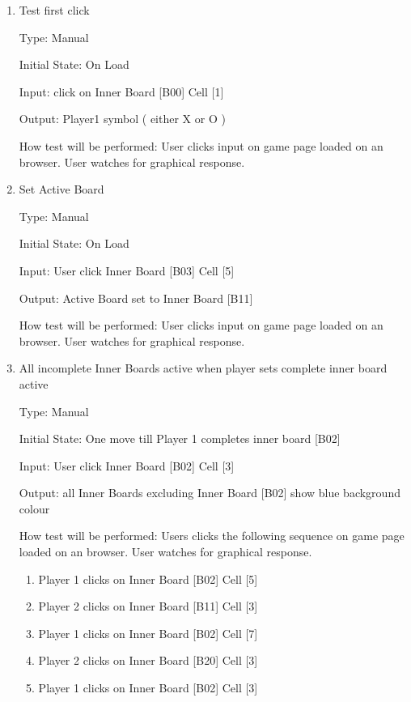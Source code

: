 \documentclass[12pt, titlepage]{article}
\begin{document}
\begin{enumerate}

\item{Test first click\\}

Type: Manual
					
Initial State: On Load
					
Input: click on Inner Board [B00] Cell [1] 
					
Output: Player1 symbol ( either X or O )
					
How test will be performed: User clicks input on game page loaded on an browser. User watches for graphical response.

\item{Set Active Board\\}

Type: Manual
					
Initial State: On Load
					
Input: User click Inner Board [B03] Cell [5] 
					
Output:  Active Board set to Inner Board [B11]
					
How test will be performed: User clicks input on game page loaded on an browser. User watches for graphical response. 

\item{All incomplete Inner Boards active when player sets complete inner board active \\}

Type: Manual
					
Initial State: One move till Player 1 completes inner board [B02]
					
Input: User click Inner Board [B02] Cell [3] 
					
Output:  all Inner Boards excluding Inner Board [B02] show blue background colour
					
How test will be performed: Users clicks the following sequence on game page loaded on an browser. User watches for graphical response.
\begin{enumerate}
	\item Player 1 clicks on Inner Board [B02] Cell [5]
	\item Player 2 clicks on Inner Board [B11] Cell [3]
	\item Player 1 clicks on Inner Board [B02] Cell [7]
	\item Player 2 clicks on Inner Board [B20] Cell [3]
	\item Player 1 clicks on Inner Board [B02] Cell [3]
\end{enumerate}

\end{enumerate}
\end{document}
